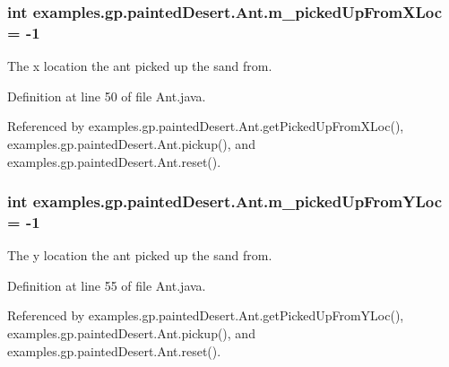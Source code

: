 \hypertarget{classexamples_1_1gp_1_1painted_desert_1_1_ant_a4c60bbb0297bd97686394a017e68959d}{
\subsubsection[{m\-\_\-picked\-Up\-From\-X\-Loc}]{\setlength{\rightskip}{0pt plus 5cm}int examples.\-gp.\-painted\-Desert.\-Ant.\-m\-\_\-picked\-Up\-From\-X\-Loc = -\/1\hspace{0.3cm}{\ttfamily [private]}}}\label{classexamples_1_1gp_1_1painted_desert_1_1_ant_a4c60bbb0297bd97686394a017e68959d}
The x location the ant picked up the sand from. 

Definition at line 50 of file Ant.\-java.



Referenced by examples.\-gp.\-painted\-Desert.\-Ant.\-get\-Picked\-Up\-From\-X\-Loc(), examples.\-gp.\-painted\-Desert.\-Ant.\-pickup(), and examples.\-gp.\-painted\-Desert.\-Ant.\-reset().

\hypertarget{classexamples_1_1gp_1_1painted_desert_1_1_ant_acb8a8d8bb3490def0171bdc5f09c0090}{
\subsubsection[{m\-\_\-picked\-Up\-From\-Y\-Loc}]{\setlength{\rightskip}{0pt plus 5cm}int examples.\-gp.\-painted\-Desert.\-Ant.\-m\-\_\-picked\-Up\-From\-Y\-Loc = -\/1\hspace{0.3cm}{\ttfamily [private]}}}\label{classexamples_1_1gp_1_1painted_desert_1_1_ant_acb8a8d8bb3490def0171bdc5f09c0090}
The y location the ant picked up the sand from. 

Definition at line 55 of file Ant.\-java.



Referenced by examples.\-gp.\-painted\-Desert.\-Ant.\-get\-Picked\-Up\-From\-Y\-Loc(), examples.\-gp.\-painted\-Desert.\-Ant.\-pickup(), and examples.\-gp.\-painted\-Desert.\-Ant.\-reset().

